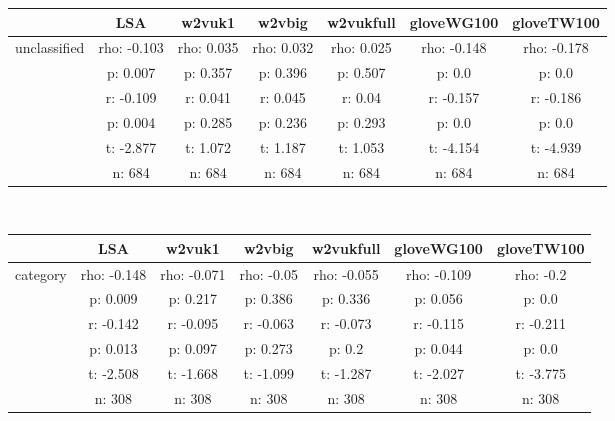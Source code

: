 \documentclass{article}
\begin{document}
\begin{tabular}{ccccccc|}\cline{2-7}
&\multicolumn{1}{|c}{LSA} & w2vuk1 & w2vbig & w2vukfull & gloveWG100 & gloveTW100 \\\hline
\multicolumn{1}{|c|}{\multirow{6}{*}{unclassified}} & rho: -0.103 & rho: 0.035 & rho: 0.032 & rho: 0.025 & rho: -0.148 & rho: -0.178 \\
\multicolumn{1}{|c|}{} & p: 0.007 & p: 0.357 & p: 0.396 & p: 0.507 & p: 0.0 & p: 0.0 \\
\multicolumn{1}{|c|}{} & r: -0.109 & r: 0.041 & r: 0.045 & r: 0.04 & r: -0.157 & r: -0.186 \\
\multicolumn{1}{|c|}{} & p: 0.004 & p: 0.285 & p: 0.236 & p: 0.293 & p: 0.0 & p: 0.0 \\
\multicolumn{1}{|c|}{} & t: -2.877 & t: 1.072 & t: 1.187 & t: 1.053 & t: -4.154 & t: -4.939 \\
\multicolumn{1}{|c|}{} & n: 684 & n: 684 & n: 684 & n: 684 & n: 684 & n: 684 \\
\hline
\end{tabular}\\
\begin{tabular}{ccccccc|}\cline{2-7}
&\multicolumn{1}{|c}{LSA} & w2vuk1 & w2vbig & w2vukfull & gloveWG100 & gloveTW100 \\\hline
\multicolumn{1}{|c|}{\multirow{6}{*}{category}} & rho: -0.148 & rho: -0.071 & rho: -0.05 & rho: -0.055 & rho: -0.109 & rho: -0.2 \\
\multicolumn{1}{|c|}{} & p: 0.009 & p: 0.217 & p: 0.386 & p: 0.336 & p: 0.056 & p: 0.0 \\
\multicolumn{1}{|c|}{} & r: -0.142 & r: -0.095 & r: -0.063 & r: -0.073 & r: -0.115 & r: -0.211 \\
\multicolumn{1}{|c|}{} & p: 0.013 & p: 0.097 & p: 0.273 & p: 0.2 & p: 0.044 & p: 0.0 \\
\multicolumn{1}{|c|}{} & t: -2.508 & t: -1.668 & t: -1.099 & t: -1.287 & t: -2.027 & t: -3.775 \\
\multicolumn{1}{|c|}{} & n: 308 & n: 308 & n: 308 & n: 308 & n: 308 & n: 308 \\
\hline
\end{tabular}\\
\end{document}
